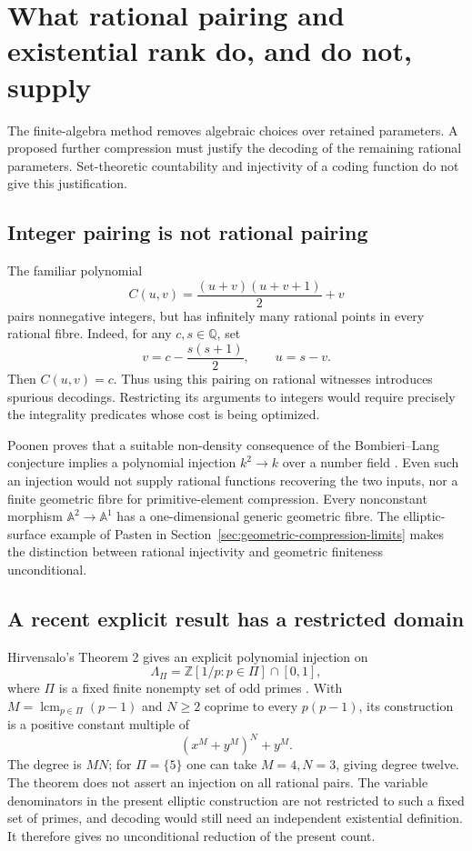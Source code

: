 \documentclass[11pt]{article}
\theoremstyle{definition}
\begin{document}
\section{What rational pairing and existential rank do, and do not, supply}
\label{sec:packing-literature}

The finite-algebra method removes algebraic choices over retained
parameters.  A proposed further compression must justify the decoding
of the remaining rational parameters.  Set-theoretic countability and
injectivity of a coding function do not give this justification.

\subsection{Integer pairing is not rational pairing}

The familiar polynomial
\[
 C(u,v)=\frac{(u+v)(u+v+1)}2+v
\]
pairs nonnegative integers, but has infinitely many rational points
in every rational fibre.  Indeed, for any $c,s\in\mathbb Q$, set
\[
 v=c-\frac{s(s+1)}2,\qquad u=s-v.
\]
Then $C(u,v)=c$.  Thus using this pairing on rational witnesses
introduces spurious decodings.  Restricting its arguments to integers
would require precisely the integrality predicates whose cost is being
optimized.

Poonen proves that a suitable non-density consequence of the
Bombieri--Lang conjecture implies a polynomial injection
$k^2\to k$ over a number field
\cite[Theorem 1.1 and Remark 1.2]{P3Poonen2010}.  Even such an
injection would not supply rational functions recovering the two
inputs, nor a finite geometric fibre for primitive-element
compression.  Every nonconstant morphism
$\mathbb A^2\to\mathbb A^1$ has a one-dimensional generic
geometric fibre.  The elliptic-surface example of Pasten in
Section~\ref{sec:geometric-compression-limits} makes the distinction
between rational injectivity and geometric finiteness unconditional.

\subsection{A recent explicit result has a restricted domain}

Hirvensalo's Theorem 2 gives an explicit polynomial injection on
\[
 \Lambda_\Pi=\mathbb Z[1/p:p\in\Pi]\cap[0,1],
\]
where $\Pi$ is a fixed finite nonempty set of odd primes
\cite{P3Hirvensalo2026}.  With
$M=\operatorname{lcm}_{p\in\Pi}(p-1)$ and $N\ge2$ coprime to
every $p(p-1)$, its construction is a positive constant multiple of
\[
                       (x^M+y^M)^N+y^M.
\]
The degree is $MN$; for $\Pi=\{5\}$ one can take $M=4,N=3$,
giving degree twelve.  The theorem does not assert an injection
on all rational pairs.  The variable denominators in the present
elliptic construction are not restricted to such a fixed set of primes,
and decoding would still need an independent existential definition.
It therefore gives no unconditional reduction of the present count.
\end{document}
